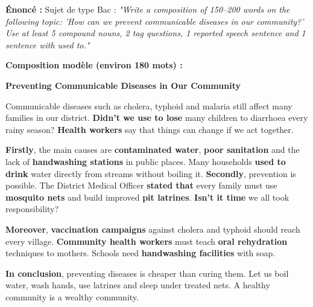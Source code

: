 \documentclass[11pt]{article}
\begin{document}
\begin{exoresolu}
\textbf{Énoncé :} Sujet de type Bac : \emph{"Write a composition of 150--200 words on the following topic: 'How can we prevent communicable diseases in our community?' Use at least 5 compound nouns, 2 tag questions, 1 reported speech sentence and 1 sentence with \emph{used to}."}

\tcblower
\textbf{Composition modèle (environ 180 mots) :}

\textbf{Preventing Communicable Diseases in Our Community}

Communicable diseases such as cholera, typhoid and malaria still affect many families in our district. \textbf{Didn't we use to lose} many children to diarrhoea every rainy season? \textbf{Health workers} say that things can change if we act together.

\textbf{Firstly}, the main causes are \textbf{contaminated water}, \textbf{poor sanitation} and the lack of \textbf{handwashing stations} in public places. Many households \textbf{used to drink} water directly from streams without boiling it. \textbf{Secondly}, prevention is possible. The District Medical Officer \textbf{stated that} every family must use \textbf{mosquito nets} and build improved \textbf{pit latrines}. \textbf{Isn't it time} we all took responsibility?

\textbf{Moreover}, \textbf{vaccination campaigns} against cholera and typhoid should reach every village. \textbf{Community health workers} must teach \textbf{oral rehydration} techniques to mothers. Schools need \textbf{handwashing facilities} with soap.

\textbf{In conclusion}, preventing diseases is cheaper than curing them. Let us boil water, wash hands, use latrines and sleep under treated nets. A healthy community is a wealthy community.


\end{exoresolu}
\end{document}
